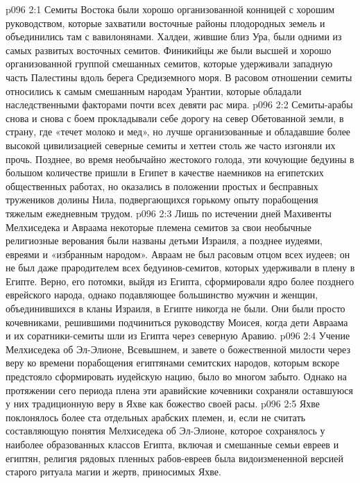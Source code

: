 \vs p096 2:1 Семиты Востока были хорошо организованной конницей с хорошим руководством, которые захватили восточные районы плодородных земель и объединились там с вавилонянами. Халдеи, жившие близ Ура, были одними из самых развитых восточных семитов. Финикийцы же были высшей и хорошо организованной группой смешанных семитов, которые удерживали западную часть Палестины вдоль берега Средиземного моря. В расовом отношении семиты относились к самым смешанным народам Урантии, которые обладали наследственными факторами почти всех девяти рас мира.
\vs p096 2:2 Семиты\hyp{}арабы снова и снова с боем прокладывали себе дорогу на север Обетованной земли, в страну, где «течет молоко и мед», но лучше организованные и обладавшие более высокой цивилизацией северные семиты и хеттеи столь же часто изгоняли их прочь. Позднее, во время необычайно жестокого голода, эти кочующие бедуины в большом количестве пришли в Египет в качестве наемников на египетских общественных работах, но оказались в положении простых и бесправных тружеников долины Нила, подвергающихся горькому опыту порабощения тяжелым ежедневным трудом.
\vs p096 2:3 Лишь по истечении дней Махивенты Мелхиседека и Авраама некоторые племена семитов за свои необычные религиозные верования были названы детьми Израиля, а позднее иудеями, евреями и «избранным народом». Авраам не был расовым отцом всех иудеев; он не был даже прародителем всех бедуинов\hyp{}семитов, которых удерживали в плену в Египте. Верно, его потомки, выйдя из Египта, сформировали ядро более позднего еврейского народа, однако подавляющее большинство мужчин и женщин, объединившихся в кланы Израиля, в Египте никогда не были. Они были просто кочевниками, решившими подчиниться руководству Моисея, когда дети Авраама и их соратники\hyp{}семиты шли из Египта через северную Аравию.
\vs p096 2:4 \pc Учение Мелхиседека об Эл\hyp{}Элионе, Всевышнем, и завете о божественной милости через веру ко времени порабощения египтянами семитских народов, которым вскоре предстояло сформировать иудейскую нацию, было во многом забыто. Однако на протяжении сего периода плена эти аравийские кочевники сохраняли оставшуюся у них традиционную веру в Яхве как божество своей расы.
\vs p096 2:5 Яхве поклонялось более ста отдельных арабских племен, и, если не считать составляющую понятия Мелхиседека об Эл\hyp{}Элионе, которое сохранялось у наиболее образованных классов Египта, включая и смешанные семьи евреев и египтян, религия рядовых пленных рабов\hyp{}евреев была видоизмененной версией старого ритуала магии и жертв, приносимых Яхве.
